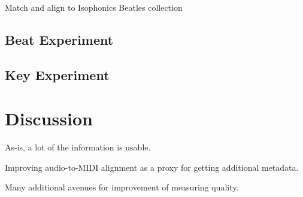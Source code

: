 \documentclass{article}
\begin{document}
Match and align to Isophonics Beatles collection

\subsection{Beat Experiment}

\subsection{Key Experiment}

\section{Discussion}

As-is, a lot of the information is usable.

Improving audio-to-MIDI alignment as a proxy for getting additional metadata.

Many additional avenues for improvement of measuring quality.
\end{document}
